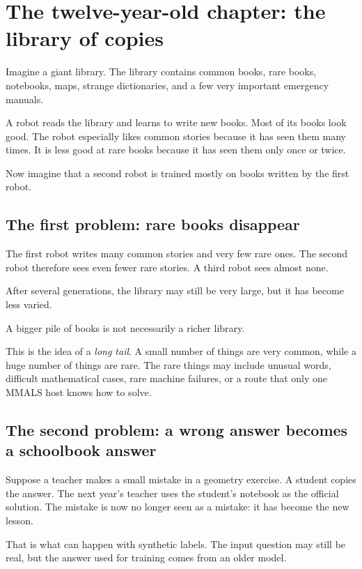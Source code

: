 \section{The twelve-year-old chapter: the library of copies}

Imagine a giant library. The library contains common books, rare books, notebooks, maps, strange dictionaries, and a few very important emergency manuals.

A robot reads the library and learns to write new books. Most of its books look good. The robot especially likes common stories because it has seen them many times. It is less good at rare books because it has seen them only once or twice.

Now imagine that a second robot is trained mostly on books written by the first robot.

\subsection{The first problem: rare books disappear}

The first robot writes many common stories and very few rare ones. The second robot therefore sees even fewer rare stories. A third robot sees almost none.

After several generations, the library may still be very large, but it has become less varied.

\begin{keyidea}
A bigger pile of books is not necessarily a richer library.
\end{keyidea}

This is the idea of a \emph{long tail}. A small number of things are very common, while a huge number of things are rare. The rare things may include unusual words, difficult mathematical cases, rare machine failures, or a route that only one MMALS host knows how to solve.

\subsection{The second problem: a wrong answer becomes a schoolbook answer}

Suppose a teacher makes a small mistake in a geometry exercise. A student copies the answer. The next year's teacher uses the student's notebook as the official solution. The mistake is now no longer seen as a mistake: it has become the new lesson.

That is what can happen with synthetic labels. The input question may still be real, but the answer used for training comes from an older model.

